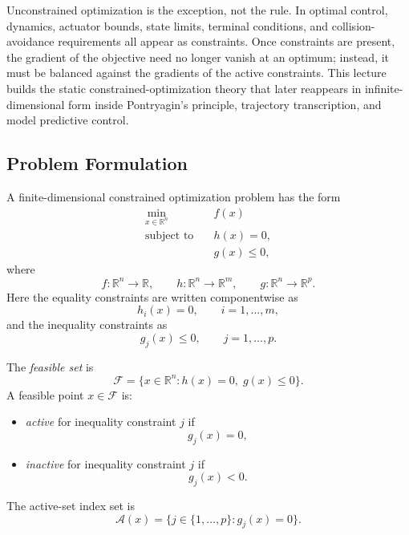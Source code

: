 \label{lec:l3}

\begin{intuition}
	Unconstrained optimization is the exception, not the rule. In optimal control, dynamics, actuator bounds, state limits, terminal conditions, and collision-avoidance requirements all appear as constraints. Once constraints are present, the gradient of the objective need no longer vanish at an optimum; instead, it must be balanced against the gradients of the active constraints. This lecture builds the static constrained-optimization theory that later reappears in infinite-dimensional form inside Pontryagin's principle, trajectory transcription, and model predictive control.
\end{intuition}

\subsection{Problem Formulation}
\label{sec:l3-problem-formulation}

\begin{definition}\label{def:l3-general-constrained-optimization-problem}
	A finite-dimensional constrained optimization problem has the form
	\begin{align*}
		\min_{x \in \mathbb{R}^n} \quad & f(x) \\
		\text{subject to} \quad & h(x)=0, \\
		                        & g(x)\le 0,
	\end{align*}
	where
	\[
		f:\mathbb{R}^n \to \mathbb{R},
		\qquad
		h:\mathbb{R}^n \to \mathbb{R}^m,
		\qquad
		g:\mathbb{R}^n \to \mathbb{R}^p.
	\]
	Here the equality constraints are written componentwise as
	\[
		h_i(x)=0, \qquad i=1,\dots,m,
	\]
	and the inequality constraints as
	\[
		g_j(x)\le 0, \qquad j=1,\dots,p.
	\]
\end{definition}

\begin{definition}\label{def:l3-feasible-set-active-set-inactive-set}
	The \emph{feasible set} is
	\[
		\mathcal{F} = \{x \in \mathbb{R}^n : h(x)=0,\; g(x)\le 0\}.
	\]
	A feasible point $x \in \mathcal{F}$ is:
	\begin{itemize}
		\item \emph{active} for inequality constraint $j$ if
		      \[
			      g_j(x)=0,
		      \]
		\item \emph{inactive} for inequality constraint $j$ if
		      \[
			      g_j(x)<0.
		      \]
	\end{itemize}
	The active-set index set is
	\[
		\mathcal{A}(x)=\{j \in \{1,\dots,p\}: g_j(x)=0\}.
	\]
\end{definition}

